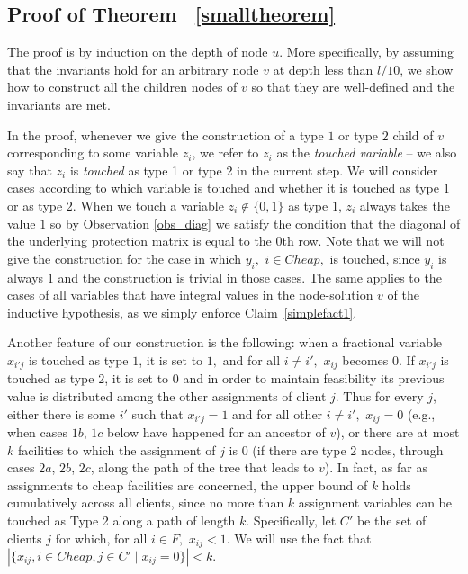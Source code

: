 \documentclass[11pt]{article}\usepackage{amsmath}
\begin{document}
\subsection{Proof of Theorem ~\ref{smalltheorem}}
\label{subsec:invproof}





The  proof is  by induction  on the  depth of  node $u$.  More  specifically, by
assuming that the invariants hold for an arbitrary node $v$ at depth
less than $l/10$, we
show  how  to construct  all  the  children nodes  of  $v$  so   that they  are
well-defined and 
the invariants are met.  

In the proof, whenever we give the  construction of a type $1$ or type $2$ child
of  $v$  corresponding  to  some  variable  $z_i$, we  refer  to  $z_i$  as  the
\emph{touched  variable} --  we also  say that  $z_i$ is
\emph{touched}  as type 1 or type 2 in the
current step.  We will consider cases according to which variable is touched and
whether it  is touched  as type $1$  or as  type $2$. When  we touch  a variable
$z_i\notin  \{0,1\}$  as type  $1$,  $z_i$  always takes  the  value  $1$ so  by
Observation \ref{obs_diag}  we satisfy  the condition that  the diagonal  of the
underlying protection matrix is equal to the $0$th row.  Note that we will not  give
the construction  for the case in  which $y_i,$ $i\in Cheap,$  is touched, since
$y_i$ is  always $1$ and  the construction is  trivial in those cases.  The same
applies  to  the  cases of  all  variables  that  have  integral values  in  the
node-solution $v$ of the inductive hypothesis, as we simply 
enforce Claim~\ref{simplefact1}.
 
Another   feature of   our construction is  the following: when  a fractional
variable $x_{i'j}$ is touched as type $1$, it is set to  $1,$ and for all
$i \neq i',$  $x_{ij}$
becomes $0$. If $x_{i'j}$ is touched as type $2$, it is set to  $0$ and
in order to maintain feasibility 
its previous value is
distributed  among the  other assignments  of client  $j$. Thus  for  every $j$,
either there is  some $i'$ such that  $x_{i'j}=1$ and for all other  $i \neq i',$
$x_{ij}=0$ (e.g.,  when cases $1b$,  $1c$ below have happened for  an ancestor of  $v$), or
there are at most $k$ facilities to which the assignment of $j$ is $0$ (if there
are type $2$ nodes,  through cases $2a$, $2b$, $2c$, along the  path of the tree
that leads  to $v$). 
In fact, as far as assignments to cheap facilities are concerned,
the upper bound of $k$ holds cumulatively  across all clients,
since 
no more than  $k$ assignment variables can be touched as Type 2 along  a
path of length $k.$ 
Specifically, 
let $C'$ be the set of clients $j$ for which, for all $i \in F,$ $x_{ij} < 1.$ 
We will use the fact that $| \{ x_{ij},  i \in Cheap, j \in C' \mid
x_{ij}=0 \}| <
k.$ 
\end{document}
